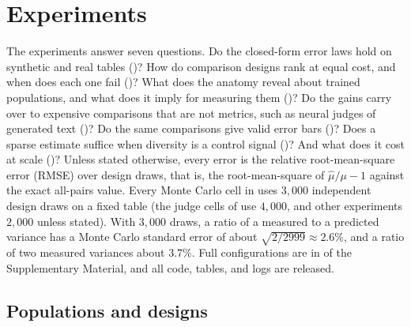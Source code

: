 \documentclass[twoside,11pt]{article}
\begin{document}
\section{Experiments}
\label{sec:experiments}

The experiments answer seven questions. Do the closed-form error laws hold on
synthetic and real tables ()? How do comparison designs rank at equal
cost, and when does each one fail ()? What does the
anatomy reveal about trained populations, and what does it imply for
measuring them ()? Do the gains carry
over to expensive comparisons that are not metrics, such as neural judges of
generated text ()? Do the same comparisons give valid
error bars ()? Does a sparse estimate suffice when
diversity is a control signal ()? And what does it
cost at scale ()? Unless stated otherwise, every
error is the relative root-mean-square error (RMSE) over design draws, that is, the root-mean-square of
$\widehat\mu/\mu-1$ against the exact all-pairs
value. Every Monte Carlo cell in  uses $3{,}000$
independent design draws on a fixed table (the judge cells of  use
$4{,}000$, and other experiments $2{,}000$ unless stated). With $3{,}000$ draws, a ratio
of a measured to a predicted variance has a Monte Carlo standard error of
about $\sqrt{2/2999}\approx 2.6\%$, and a ratio of two measured variances
about $3.7\%$. Full configurations are in
 of the Supplementary Material, and all code, tables,
and logs are released.

\subsection{Populations and designs}
\label{sec:exp-setup}
\end{document}
